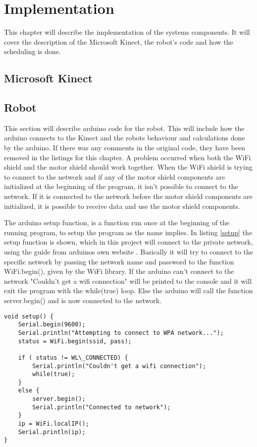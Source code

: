 \chapter{Implementation}
\label{chap:Implementation}
This chapter will describe the implementation of the systems components. It will cover the description of the Microsoft Kinect, the robot's code and how the scheduling is done. 

\section{Microsoft Kinect}
\label{sec:Microsoft Kinect Implementation}

\section{Robot}
\label{sec:Robot}
This section will describe arduino code for the robot. This will include how the arduino connects to the Kinect and the robots behaviour and calculations done by the arduino. If there was any comments in the original code, they have been removed in the listings for this chapter. \newline
A problem occurred when both the WiFi shield and the motor shield should work together. When the WiFi shield is trying to connect to the network and if any of the motor shield components are initialized at the beginning of the program, it isn't possible to connect to the network. If it is connected to the network before the motor shield components are initialized, it is possible to receive data and use the motor shield components.

The arduino setup function, is a function run once at the beginning of the running program, to setup the program as the name implies. In listing \ref{setup} the setup function is shown, which in this project will connect to the private network, using the guide from arduinos own website \citep{wg}. \newline
Basically it will try to connect to the specific network by passing the network name and password to the function WiFi.begin(), given by the WiFi library. If the arduino can't connect to the network "Couldn't get a wifi connection" will be printed to the console and it will exit the program with the while(true) loop. Else the arduino will call the function server.begin() and is now connected to the network.

\begin{lstlisting}[caption={The arduino setup function}, label={setup}]
void setup() {
	Serial.begin(9600);           
	Serial.println("Attempting to connect to WPA network...");
	status = WiFi.begin(ssid, pass);

	if ( status != WL\_CONNECTED) { 
		Serial.println("Couldn't get a wifi connection");
		while(true);
	} 
	else {
		server.begin();
		Serial.println("Connected to network");
	}	
	ip = WiFi.localIP();
	Serial.println(ip);
}
\end{lstlisting}


